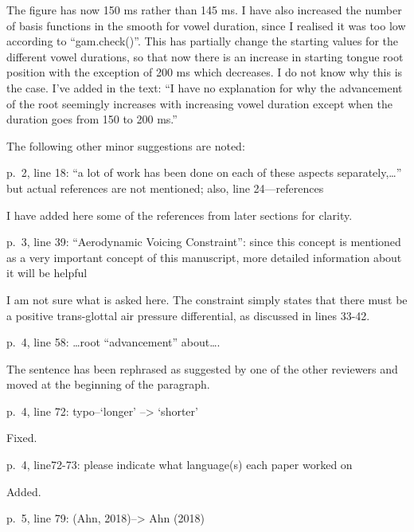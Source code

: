 \documentclass[]{article}
\begin{document}
\color{plum}

The figure has now 150 ms rather than 145 ms. I have also increased the
number of basis functions in the smooth for vowel duration, since I
realised it was too low according to ``gam.check()''. This has partially
change the starting values for the different vowel durations, so that
now there is an increase in starting tongue root position with the
exception of 200 ms which decreases. I do not know why this is the case.
I've added in the text: ``I have no explanation for why the advancement
of the root seemingly increases with increasing vowel duration except
when the duration goes from 150 to 200 ms.'' \color{black}

The following other minor suggestions are noted:

p.~2, line 18: ``a lot of work has been done on each of these aspects
separately,\ldots{}'' but actual references are not mentioned; also,
line 24---references

\color{plum}

I have added here some of the references from later sections for
clarity. \color{black}

p.~3, line 39: ``Aerodynamic Voicing Constraint'': since this concept is
mentioned as a very important concept of this manuscript, more detailed
information about it will be helpful

\color{plum}

I am not sure what is asked here. The constraint simply states that
there must be a positive trans-glottal air pressure differential, as
discussed in lines 33-42. \color{black}

p.~4, line 58: \ldots{}root ``advancement'' about\ldots{}.

\color{plum}

The sentence has been rephrased as suggested by one of the other
reviewers and moved at the beginning of the paragraph. \color{black}

p.~4, line 72: typo--`longer' --\textgreater{} `shorter'

\color{plum}

Fixed. \color{black}

p.~4, line72-73: please indicate what language(s) each paper worked on

\color{plum}

Added. \color{black}

p.~5, line 79: (Ahn, 2018)--\textgreater{} Ahn (2018)

\color{plum}
\end{document}
